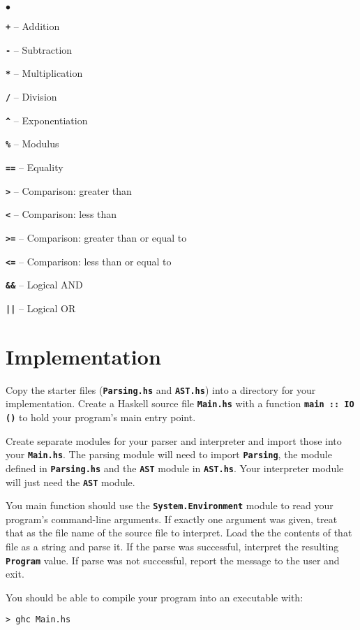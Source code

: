 \documentclass[12pt]{article}
\newcommand\code[1]{\texttt{\textbf{#1}}}
\newenvironment{notelist}{\begin{list}
   {$\bullet$}
   {\setlength{\itemsep}{0in}}}
   {\end{list}}
\begin{document}
\begin{notelist}
    \item \code{+} -- Addition
    \item \code{-} -- Subtraction
    \item \code{*} -- Multiplication
    \item \code{/} -- Division
    \item \code{\^} -- Exponentiation
    \item \code{\%} -- Modulus
    \item \code{==} -- Equality
    \item \code{>} -- Comparison: greater than
    \item \code{<} -- Comparison: less than
    \item \code{>=} -- Comparison: greater than or equal to
    \item \code{<=} -- Comparison: less than or equal to
    \item \code{\&\&} -- Logical AND
    \item \code{||} -- Logical OR
\end{notelist}

\section{Implementation}

Copy the starter files (\code{Parsing.hs} and \code{AST.hs}) into a directory for your implementation.
Create a Haskell source file \code{Main.hs} with a function \code{main :: IO ()} to hold your 
program's main entry point.

Create separate modules for your parser and interpreter and import those into your \code{Main.hs}. 
The parsing module will need to import \code{Parsing}, the module defined in \code{Parsing.hs} and
the \code{AST} module in \code{AST.hs}. Your interpreter module will just need the \code{AST} module.

You main function should use the \code{System.Environment} module to read your program's command-line
arguments. If exactly one argument was given, treat that as the file name of the source file to
interpret. Load the the contents of that file as a string and parse it. If the parse was successful,
interpret the resulting \code{Program} value. If parse was not successful, report the message to the 
user and exit.

You should be able to compile your program into an executable with:

\begin{lstlisting}
> ghc Main.hs
\end{lstlisting}
\end{document}
